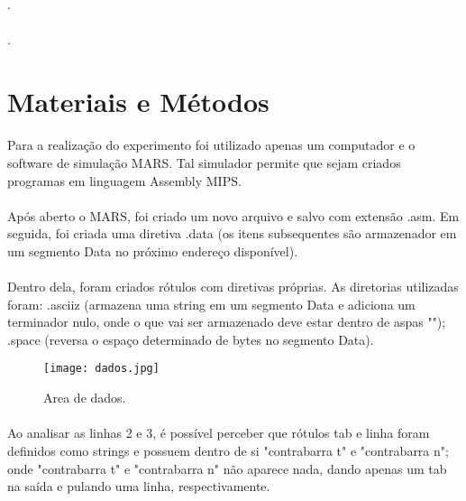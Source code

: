 \documentclass[12pt]{article}
\begin{document}
    \paragraph{}
    .
    \paragraph{}
    .

\section{Materiais e Métodos}
\label{sec:examples}
    \paragraph{}
    Para a realização do experimento foi utilizado apenas um computador e o software de simulação MARS. Tal simulador permite que sejam criados programas em linguagem Assembly MIPS.
	\paragraph{}
	Após aberto o MARS, foi criado um novo arquivo e salvo com extensão .asm. Em seguida, foi criada uma diretiva .data (os itens subsequentes são armazenador em um segmento Data no próximo endereço disponível).
	\paragraph{}
	Dentro dela, foram criados rótulos com diretivas próprias. As diretorias utilizadas foram: .asciiz (armazena uma string em um segmento Data e adiciona um terminador nulo, onde o que vai ser armazenado deve estar dentro de aspas ""); .space (reversa o espaço determinado de bytes no segmento Data).
	
\begin{figure}[h!]
    \texttt{[image: dados.jpg]}
    \caption{Area de dados.}
    \label{fig:areadedados}
\end{figure}

    \paragraph{}
    Ao analisar as linhas 2 e 3, é possível perceber que rótulos tab e linha foram definidos como strings e possuem dentro de si "contrabarra t" e "contrabarra n"; onde "contrabarra t" e "contrabarra n" não aparece nada, dando apenas um tab na saída e pulando uma linha, respectivamente. 
\end{document}

